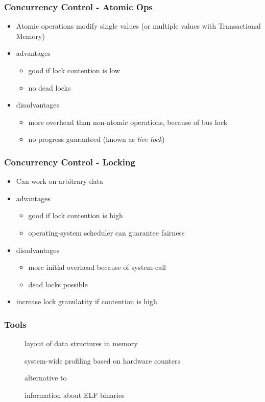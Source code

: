\begin{frame}
 \frametitle{Concurrency Control - Atomic Ops}
 \begin{itemize}
  \item Atomic operations modify single values (or multiple values with Transactional Memory)
  \item advantages
   \begin{itemize}
    \item good if lock contention is low
    \item no dead locks
   \end{itemize}
  \item disadvantages
   \begin{itemize}
    \item more overhead than non-atomic operations, because of bus lock
    \item no progress guaranteed (known as \textit{live lock})
   \end{itemize}
 \end{itemize}
\end{frame}

\begin{frame}
 \frametitle{Concurrency Control - Locking}
 \begin{itemize}
  \item Can work on arbitrary data
  \item advantages
   \begin{itemize}
    \item good if lock contention is high
    \item operating-system scheduler can guarantee fairness
   \end{itemize}
  \item disadvantages
   \begin{itemize}
    \item more initial overhead because of system-call
    \item dead locks possible
   \end{itemize}
  \item increase lock granulatity if contention is high
 \end{itemize}
\end{frame}

\begin{frame}
 \frametitle{Tools}
 \begin{description}
  \item[] layout of data structures in memory
  \item[] system-wide profiling based on hardware counters
  \item[] alternative to 
  \item[] information about ELF binaries
 \end{description}
\end{frame}
